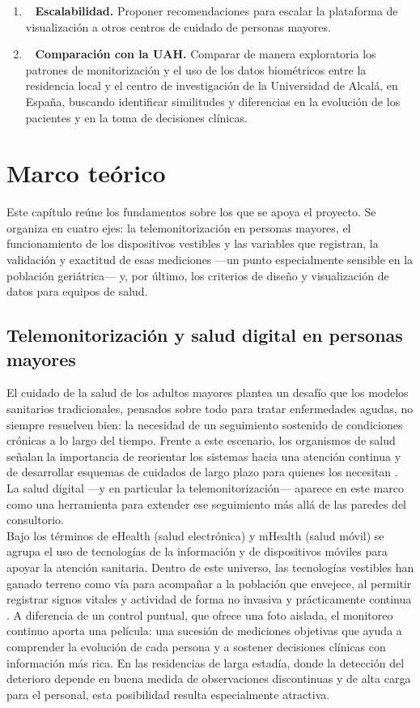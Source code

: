 \begin{enumerate}
\item~ \textbf{Escalabilidad.} Proponer recomendaciones para escalar la plataforma de visualización a otros centros de cuidado de personas mayores.
\item~ \textbf{Comparación con la UAH.} Comparar de manera exploratoria los patrones de monitorización y el uso de los datos biométricos entre la residencia local y el centro de investigación de la Universidad de Alcalá, en España, buscando identificar similitudes y diferencias en la evolución de los pacientes y en la toma de decisiones clínicas.
\end{enumerate}

\section{Marco teórico}
Este capítulo reúne los fundamentos sobre los que se apoya el proyecto. Se organiza en cuatro ejes: la telemonitorización en personas mayores, el funcionamiento de los dispositivos vestibles y las variables que registran, la validación y exactitud de esas mediciones —un punto especialmente sensible en la población geriátrica— y, por último, los criterios de diseño y visualización de datos para equipos de salud.\\


\subsection{Telemonitorización y salud digital en personas mayores}
El cuidado de la salud de los adultos mayores plantea un desafío que los modelos sanitarios tradicionales, pensados sobre todo para tratar enfermedades agudas, no siempre resuelven bien: la necesidad de un seguimiento sostenido de condiciones crónicas a lo largo del tiempo. Frente a este escenario, los organismos de salud señalan la importancia de reorientar los sistemas hacia una atención continua y de desarrollar esquemas de cuidados de largo plazo para quienes los necesitan \cite{who_ageing}. La salud digital —y en particular la telemonitorización— aparece en este marco como una herramienta para extender ese seguimiento más allá de las paredes del consultorio.\\

Bajo los términos de eHealth (salud electrónica) y mHealth (salud móvil) se agrupa el uso de tecnologías de la información y de dispositivos móviles para apoyar la atención sanitaria. Dentro de este universo, las tecnologías vestibles han ganado terreno como vía para acompañar a la población que envejece, al permitir registrar signos vitales y actividad de forma no invasiva y prácticamente continua \cite{malwade2018}. A diferencia de un control puntual, que ofrece una foto aislada, el monitoreo continuo aporta una película: una sucesión de mediciones objetivas que ayuda a comprender la evolución de cada persona y a sostener decisiones clínicas con información más rica. En las residencias de larga estadía, donde la detección del deterioro depende en buena medida de observaciones discontinuas y de alta carga para el personal, esta posibilidad resulta especialmente atractiva.\\

